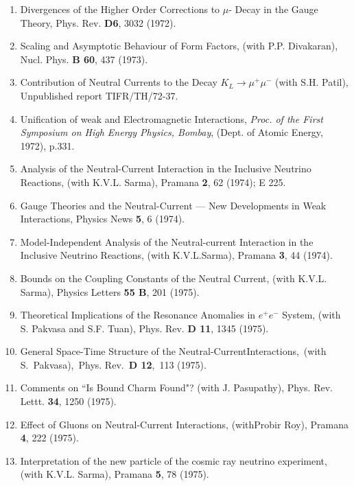 \begin{enumerate}
\item Divergences of the Higher Order Corrections to $\mu$- Decay in the
Gauge Theory, Phys. Rev. {\bf D6}, 3032 (1972).

\item Scaling and Asymptotic Behaviour of Form Factors, (with P.P.
Divakaran), Nucl. Phys. {\bf B 60}, 437 (1973).

\item Contribution of Neutral Currents to the Decay $K_L \rightarrow
\mu^+ \mu^-$ (with S.H. Patil), Unpublished report TIFR/TH/72-37.

\item Unification of weak and Electromagnetic Interactions, {\it Proc. of the
First Symposium on High Energy Physics, Bombay}, (Dept. of Atomic
Energy, 1972), p.331.

\item Analysis of the Neutral-Current Interaction in the Inclusive
Neutrino Reactions, (with K.V.L. Sarma), Pramana {\bf 2}, 62 (1974); E 225.

\item Gauge Theories and the Neutral-Current --- New Developments in Weak
Interactions,  Physics News {\bf 5}, 6 (1974).

\item Model-Independent Analysis of the Neutral-current Interac\-tion in
the Inclusive Neutrino Reactions, (with K.V.L.\break Sarma), Pramana {\bf 3}, 
44 (1974).

\item Bounds on the Coupling Constants of the Neutral Current, (with
K.V.L. Sarma), Physics Letters {\bf 55 B}, 201 (1975).

\item Theoretical Implications of the Resonance Anomalies in $e^+ e^-$
System, (with S. Pakvasa and S.F. Tuan), Phys. Rev. {\bf D 11}, 1345 (1975).

\item General Space-Time Structure of the Neutral-Current\break Interactions,\ 
(with S.\ Pakvasa),\ Phys. Rev.\ {\bf D 12},\ 113 (1975).

\item Comments on ``Is Bound Charm Found"? (with J. Pasu\-pathy), 
Phys. Rev. Lettt. {\bf 34}, 1250 (1975).

\item Effect of Gluons on Neutral-Current Interactions, (with\break Probir
Roy), Pramana {\bf 4}, 222 (1975).

\item Interpretation of the new particle of the cosmic ray neutrino
experiment, (with K.V.L. Sarma), Pramana {\bf 5}, 78 (1975).


\end{enumerate}
